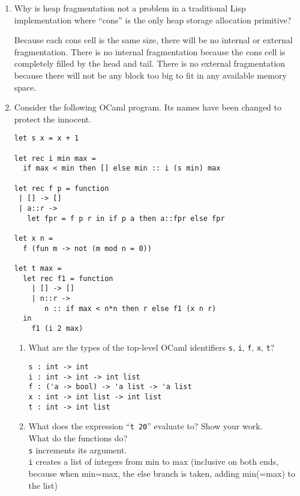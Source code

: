\documentclass[10pt]{article}
\begin{document}
\begin{enumerate}
        \item Why is heap fragmentation not a problem in a traditional Lisp implementation where ``cons'' is the only heap storage allocation
        primitive?

        Because each cons cell is the same size, there will be no internal or external fragmentation. There is no internal fragmentation
        because the cons cell is completely filled by the head and tail.  There is no external fragmentation because there will not be
        any block too big to fit in any available memory space.

        \item Consider the following OCaml program. Its names have been changed to protect the innocent.

\begin{verbatim}
let s x = x + 1

let rec i min max =
  if max < min then [] else min :: i (s min) max

let rec f p = function
 | [] -> []
 | a::r ->
   let fpr = f p r in if p a then a::fpr else fpr

let x n =
  f (fun m -> not (m mod n = 0))

let t max =
  let rec f1 = function
    | [] -> []
    | n::r ->
       n :: if max < n*n then r else f1 (x n r)
  in
    f1 (i 2 max)
\end{verbatim}

        \begin{enumerate}
                \item What are the types of the top-level OCaml identifiers \texttt{s}, \texttt{i}, \texttt{f}, \texttt{x}, \texttt{t}?

\begin{verbatim}
s : int -> int
i : int -> int -> int list
f : ('a -> bool) -> 'a list -> 'a list
x : int -> int list -> int list
t : int -> int list
\end{verbatim}

                \item What does the expression ``\texttt{t 20}'' evaluate to? Show your work.\\

                What do the functions do?\\

                \texttt{s} increments its argument.\\

                \texttt{i} creates a list of integers from min to max (inclusive on both ends, because
                when min=max, the else branch is taken, adding min(=max) to the list)\\


\end{enumerate}
\end{enumerate}
\end{document}

